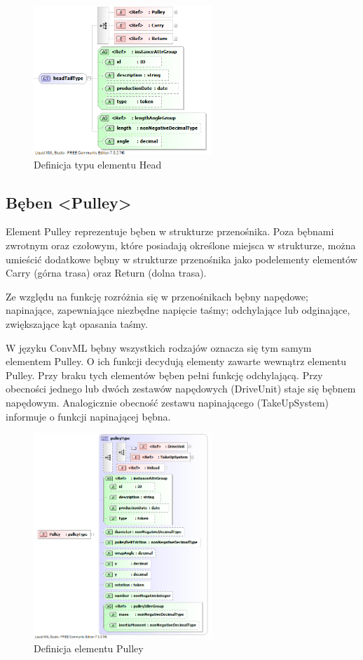 \documentclass[12pt,a4paper]{article}
\begin{document}
\begin{figure}[h]
  \centering
  \includegraphics[width=0.6\textwidth]{png/liquid/headTailType}
  \caption{Definicja typu elementu Head}
  \label{fig:headTailType-xsd}
\end{figure}


\subsection{Bęben <Pulley>}
Element Pulley reprezentuje bęben w strukturze przenośnika.  Poza bębnami
zwrotnym oraz czołowym, które posiadają określone miejsca w strukturze, można
umieścić dodatkowe bębny w strukturze przenośnika jako podelementy elementów
Carry (górna trasa) oraz Return (dolna trasa).

Ze względu na funkcję rozróżnia się w przenośnikach bębny napędowe; napinające,
zapewniające niezbędne napięcie taśmy; odchylające lub odginające, zwiększające
kąt opasania taśmy.

W języku ConvML bębny wszystkich rodzajów oznacza się tym samym elementem
Pulley.  O ich funkcji decydują elementy zawarte wewnątrz elementu Pulley. Przy
braku tych elementów bęben pełni funkcję odchylającą.  Przy obecności jednego
lub dwóch zestawów napędowych (DriveUnit) staje się bębnem napędowym.
Analogicznie obecność zestawu napinającego (TakeUpSystem) informuje o funkcji
napinającej bębna.

\begin{figure}[h]
  \centering
  \includegraphics[width=0.6\textwidth]{png/liquid/Pulley}
  \caption{Definicja elementu Pulley}
  \label{fig:pulley-xsd}
\end{figure}
\end{document}
